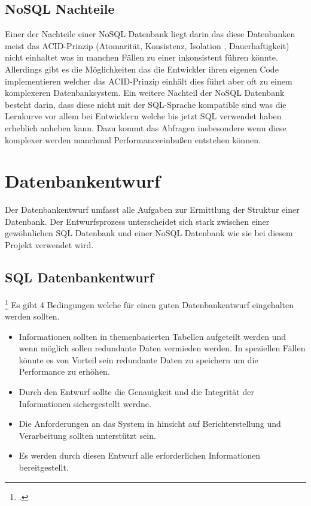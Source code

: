 	\subsection{NoSQL Nachteile}
		Einer der Nachteile einer NoSQL Datenbank liegt darin das diese Datenbanken meist das ACID-Prinzip (Atomarität, Konsistenz, Isolation , Dauerhaftigkeit) nicht einhaltet was in manchen Fällen zu einer inkonsistent führen könnte. Allerdings gibt es die Möglichkeiten das die Entwickler ihren eigenen Code implementieren welcher das ACID-Prinzip einhält dies führt aber oft zu einem komplexeren Datenbanksystem. Ein weitere Nachteil der NoSQL Datenbank besteht darin, dass diese nicht mit der SQL-Sprache kompatible sind was die Lernkurve vor allem bei Entwicklern welche bis jetzt SQL verwendet haben erheblich anheben kann. Dazu kommt das Abfragen insbesondere wenn diese komplexer werden manchmal Performanceeinbußen entstehen können.
		
	\section{Datenbankentwurf}
		Der Datenbankentwurf umfasst alle Aufgaben zur Ermittlung der Struktur einer Datenbank. Der Entwurfsprozess unterscheidet sich stark zwischen einer gewöhnlichen SQL Datenbank und einer NoSQL Datenbank wie sie bei diesem Projekt verwendet wird.
		
		\subsection{SQL Datenbankentwurf} \footcite{microsoftsql}
			Es gibt 4 Bedingungen welche für einen guten Datenbankentwurf eingehalten werden sollten.

			\begin{itemize}
				\item Informationen sollten in themenbasierten Tabellen aufgeteilt werden und wenn möglich sollen redundante Daten vermieden werden. In speziellen Fällen könnte es von Vorteil sein redundante Daten zu speichern um die Performance zu erhöhen.
				\item Durch den Entwurf sollte die Genauigkeit und die Integrität der Informationen sichergestellt werdne.
				\item Die Anforderungen an das System in hinsicht auf Berichterstellung und Verarbeitung sollten unterstützt sein.
				\item Es werden durch diesen Entwurf alle erforderlichen Informationen bereitgestellt. 
			\end{itemize}
			

